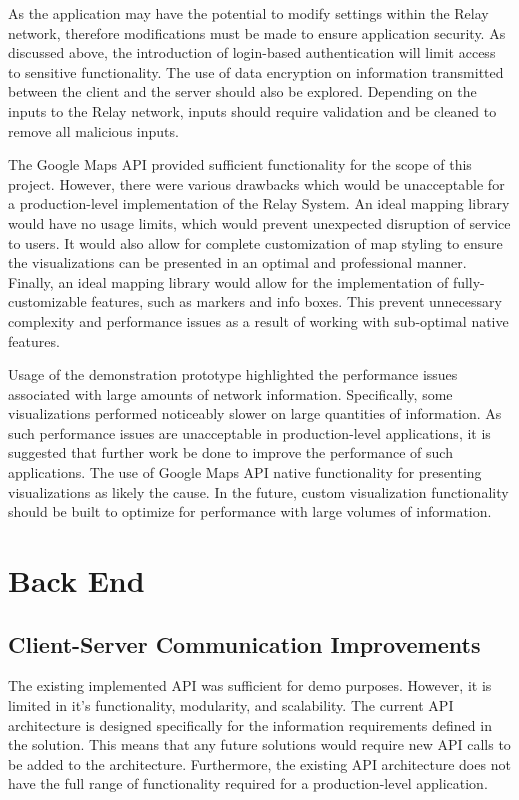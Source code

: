 \documentclass{report}
\begin{document}
As the application may have the potential to modify settings within the Relay network, therefore modifications must be made to ensure application security. As discussed above, the introduction of login-based authentication will limit access to sensitive functionality. The use of data encryption on information transmitted between the client and the server should also be explored. Depending on the inputs to the Relay network, inputs should require validation and be cleaned to remove all malicious inputs.

The Google Maps API provided sufficient functionality for the scope of this project. However, there were various drawbacks which would be unacceptable for a production-level implementation of the Relay System. An ideal mapping library would have no usage limits, which would prevent unexpected disruption of service to users. It would also allow for complete customization of map styling to ensure the visualizations can be presented in an optimal and professional manner. Finally, an ideal mapping library would allow for the implementation of fully-customizable features, such as markers and info boxes. This prevent unnecessary complexity and performance issues as a result of working with sub-optimal native features.

Usage of the demonstration prototype highlighted the performance issues associated with large amounts of network information. Specifically, some visualizations performed noticeably slower on large quantities of information. As such performance issues are unacceptable in production-level applications, it is suggested that further work be done to improve the performance of such applications. The use of Google Maps API native functionality for presenting visualizations as likely the cause. In the future, custom visualization functionality should be built to optimize for performance with large volumes of information.

\section{Back End}

\subsection{Client-Server Communication Improvements}

The existing implemented API was sufficient for demo purposes. However, it is limited in it's functionality, modularity, and scalability. The current API architecture is designed specifically for the information requirements defined in the solution. This means that any future solutions would require new API calls to be added to the architecture. Furthermore, the existing API architecture does not have the full range of functionality required for a production-level application.
\end{document}
